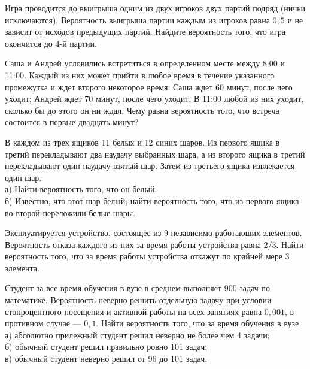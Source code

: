 \newpage\setcounter{zad}{0}



\begin{zkrW}{20}\noindent 
	Игра проводится до выигрыша одним из двух игроков двух партий подряд (ничьи исключаются). Вероятность выигрыша партии каждым из игроков равна $0{,}5$ и не зависит от исходов предыдущих партий. Найдите вероятность того, что игра окончится до 4-й партии.
 
\end{zkrW}

\begin{zkrW}{20}\noindent 
	Саша и Андрей условились встретиться в определенном месте между 8:00 и 11:00. Каждый из них может прийти в любое время в течение указанного промежутка и ждет второго некоторое время. Саша ждет 60 минут, после чего уходит; Андрей ждет 70 минут, после чего уходит. В 11:00 любой из них уходит, сколько бы до этого он ни ждал. Чему равна вероятность того, что встреча состоится в первые двадцать минут?
 
\end{zkrW}

\begin{zkrW}{20}\noindent 
	В каждом из трех ящиков 11 белых и 12 синих шаров. Из первого ящика в третий перекладывают два наудачу выбранных шара, а из второго ящика в третий перекладывают один наудачу взятый шар. Затем из третьего ящика извлекается один шар. \\ \indent а) Найти вероятность того, что он белый. \\ \indent б) Известно, что этот шар белый; найти вероятность того, что из первого ящика во второй переложили белые шары.
 
\end{zkrW}

\begin{zkrW}{20}\noindent 
	Эксплуатируется устройство, состоящее из 9 независимо работающих элементов. Вероятность отказа каждого из них за время работы устройства равна $2/3$. Найти вероятность того, что за время работы устройства откажут по крайней мере 3 элемента.
 
\end{zkrW}

\begin{zkrW}{20}\noindent 
	Студент за все время обучения в вузе в среднем выполняет 900 задач по математике. Вероятность неверно решить отдельную задачу при условии стопроцентного посещения и активной работы на всех занятиях равна $0{,}001$, в противном случае --- $0{,}1$. Найти вероятность того, что за время обучения в вузе \\ \indent а) абсолютно прилежный студент решил неверно не более чем 4 задачи; \\ \indent б) обычный студент решил правильно ровно 101 задач; \\ \indent в) обычный студент неверно решил от 96 до 101 задач.
 
\end{zkrW}

